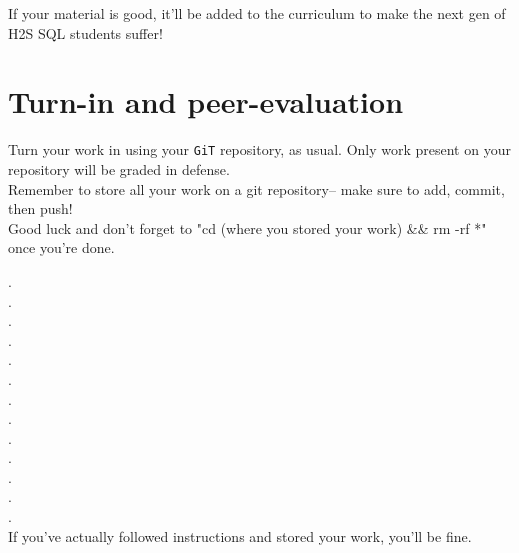 \documentclass{42-en}
\begin{document}
	If your material is good, it'll be added to the curriculum to make the 
	next gen of H2S SQL students suffer! 

\chapter{Turn-in and peer-evaluation}
    Turn your work in using your \texttt{GiT} repository, as
    usual. Only work present on your repository will be graded in defense. \\
	
	Remember to store all your work on a git repository-- make sure to add, commit, then push! \\ 

    Good luck and don't forget to "cd (where you stored your work) \&\& rm -rf *" once you're done.

    . \\

    . \\

    . \\ 

    . \\ 

    . \\ 

    . \\

    . \\

    . \\

    . \\
    
    . \\

    . \\
    
    . \\

    . \\

    If you've actually followed instructions and stored your work, you'll be fine.

\end{document}
